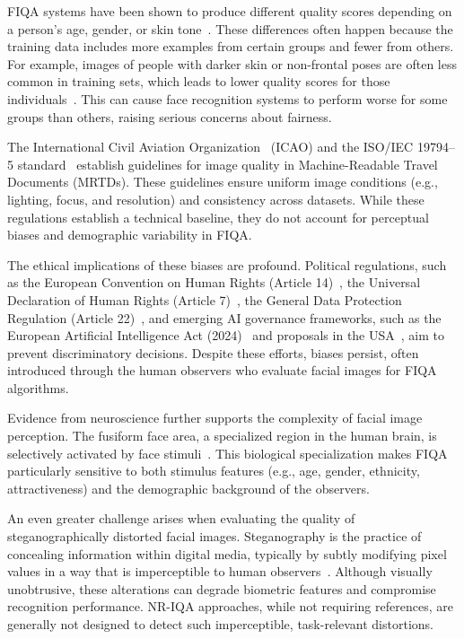 FIQA systems have been shown to produce different quality scores depending on a person's age, gender, or skin tone~\cite{jo_ifqa_2024, FaceMetric2025}. These differences often happen because the training data includes more examples from certain groups and fewer from others. For example, images of people with darker skin or non-frontal poses are often less common in training sets, which leads to lower quality scores for those individuals~\cite{kanwisher2006fusiform}. This can cause face recognition systems to perform worse for some groups than others, raising serious concerns about fairness.

The International Civil Aviation Organization~\cite{icao_2015} (ICAO) and the ISO/IEC 19794--5 standard~\cite{iso_iec29794-5_2010} establish guidelines for image quality in Machine-Readable Travel Documents (MRTDs). These guidelines ensure uniform image conditions (e.g., lighting, focus, and resolution) and consistency across datasets. While these regulations establish a technical baseline, they do not account for perceptual biases and demographic variability in FIQA.\@

The ethical implications of these biases are profound. Political regulations, such as the European Convention on Human Rights (Article 14)~\cite{echr_article14}, the Universal Declaration of Human Rights (Article 7)~\cite{udhr_article7}, the General Data Protection Regulation (Article 22)~\cite{gdpr_article22}, and emerging AI governance frameworks, such as the European Artificial Intelligence Act (2024)~\cite{eu_ai_act_2024} and proposals in the USA~\cite{us_ai_bill_rights_2022}, aim to prevent discriminatory decisions. Despite these efforts, biases persist, often introduced through the human observers who evaluate facial images for FIQA algorithms.

Evidence from neuroscience further supports the complexity of facial image perception. The fusiform face area, a specialized region in the human brain, is selectively activated by face stimuli~\cite{kanwisher2006fusiform, tsao2008mechanisms}. This biological specialization makes FIQA particularly sensitive to both stimulus features (e.g., age, gender, ethnicity, attractiveness) and the demographic background of the observers.

An even greater challenge arises when evaluating the quality of steganographically distorted facial images. Steganography is the practice of concealing information within digital media, typically by subtly modifying pixel values in a way that is imperceptible to human observers~\cite{steganography}. Although visually unobtrusive, these alterations can degrade biometric features and compromise recognition performance. NR-IQA approaches, while not requiring references, are generally not designed to detect such imperceptible, task-relevant distortions.

